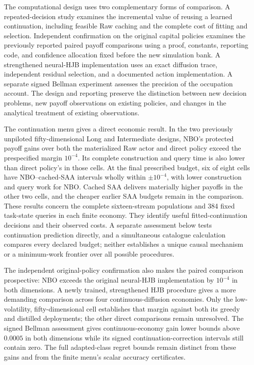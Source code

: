 The computational design uses two complementary forms of comparison. A repeated-decision study examines the incremental value of reusing a learned continuation, including feasible Raw caching and the complete cost of fitting and selection. Independent confirmation on the original capital policies examines the previously reported paired payoff comparisons using a proof, constants, reporting code, and confidence allocation fixed before the new simulation bank. A strengthened neural-HJB implementation uses an exact diffusion trace, independent residual selection, and a documented action implementation. A separate signed Bellman experiment assesses the precision of the occupation account. The design and reporting preserve the distinction between new decision problems, new payoff observations on existing policies, and changes in the analytical treatment of existing observations.

The continuation menu gives a direct economic result. In the two previously unpiloted fifty-dimensional Long and Intermediate designs, NBO's protected payoff gains over both the materialized Raw actor and direct policy exceed the prespecified margin $10^{-4}$. Its complete construction and query time is also lower than direct policy's in those cells. At the final prescribed budget, six of eight cells have NBO--cached-SAA intervals wholly within $\pm10^{-4}$, with lower construction and query work for NBO. Cached SAA delivers materially higher payoffs in the other two cells, and the cheaper earlier SAA budgets remain in the comparison. These results concern the complete sixteen-stream populations and 384 fixed task-state queries in each finite economy. They identify useful fitted-continuation decisions and their observed costs. A separate assessment below tests continuation prediction directly, and a simultaneous catalogue calculation compares every declared budget; neither establishes a unique causal mechanism or a minimum-work frontier over all possible procedures.

The independent original-policy confirmation also makes the paired comparison prospective: NBO exceeds the original neural-HJB implementation by $10^{-4}$ in both dimensions. A newly trained, strengthened HJB procedure gives a more demanding comparison across four continuous-diffusion economies. Only the low-volatility, fifty-dimensional cell establishes that margin against both its greedy and distilled deployments; the other direct comparisons remain unresolved. The signed Bellman assessment gives continuous-economy gain lower bounds above $0.0005$ in both dimensions while its signed continuation-correction intervals still contain zero. The full adapted-class regret bounds remain distinct from these gains and from the finite menu's scalar accuracy certificates.

